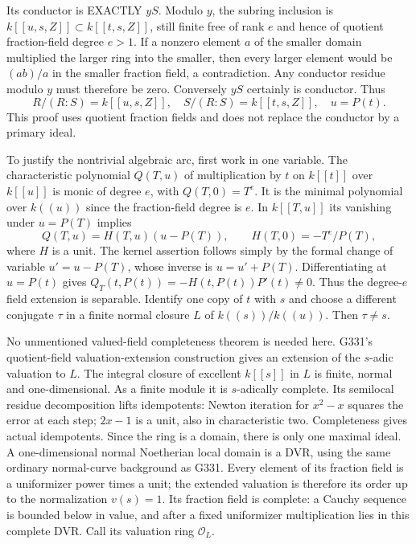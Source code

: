 \documentclass[11pt]{article}
\begin{document}
Its conductor is EXACTLY $yS$. Modulo $y$, the subring inclusion is
$k[[u,s,Z]]\subset k[[t,s,Z]]$, still finite free of rank $e$ and hence
of quotient fraction-field degree $e>1$. If a nonzero element $a$ of the
smaller domain multiplied the larger ring into the smaller, then every
larger element would be $(ab)/a$ in the smaller fraction field, a
contradiction. Any conductor residue modulo $y$ must therefore be zero.
Conversely $yS$ certainly is conductor. Thus
\[
 R/(R:S)=k[[u,s,Z]],\quad S/(R:S)=k[[t,s,Z]],\quad u=P(t).
\]
This proof uses quotient fraction fields and does not replace the
conductor by a primary ideal.

To justify the nontrivial algebraic arc, first work in one variable.
The characteristic polynomial $Q(T,u)$ of multiplication by $t$ on
$k[[t]]$ over $k[[u]]$ is monic of degree $e$, with $Q(T,0)=T^e$.
It is the minimal polynomial over $k((u))$ since the fraction-field
degree is $e$. In $k[[T,u]]$ its vanishing under $u=P(T)$ implies
\[
 Q(T,u)=H(T,u)(u-P(T)),\qquad H(T,0)=-T^e/P(T),
\]
where $H$ is a unit. The kernel assertion follows simply by the formal
change of variable $u'=u-P(T)$, whose inverse is $u=u'+P(T)$.
Differentiating at $u=P(t)$ gives
$Q_T(t,P(t))=-H(t,P(t))P'(t)\ne0$. Thus the degree-$e$ field extension
is separable. Identify one copy of $t$ with $s$ and choose a different
conjugate $\tau$ in a finite normal closure $L$ of $k((s))/k((u))$.
Then $\tau\ne s$.

No unmentioned valued-field completeness theorem is needed here.
G331's quotient-field valuation-extension construction gives an extension
of the $s$-adic valuation to $L$. The integral closure of excellent
$k[[s]]$ in $L$ is finite, normal and one-dimensional. As a finite module
it is $s$-adically complete. Its semilocal residue decomposition lifts
idempotents: Newton iteration for $x^2-x$ squares the error at each step;
$2x-1$ is a unit, also in characteristic two. Completeness gives actual
idempotents. Since the ring is a domain, there is only one maximal ideal.
A one-dimensional normal Noetherian local domain is a DVR, using the same
ordinary normal-curve background as G331. Every element of its fraction
field is a uniformizer power times a unit; the extended valuation is
therefore its order up to the normalization $v(s)=1$. Its fraction field
is complete: a Cauchy sequence is bounded below in value, and after a
fixed uniformizer multiplication lies in this complete DVR. Call its
valuation ring $\mathcal O_L$.
\end{document}
